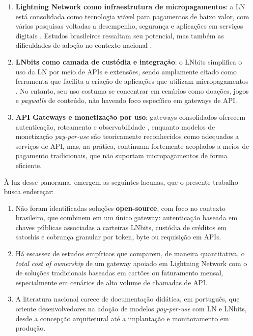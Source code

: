\documentclass[openright]{normas-utf-tex}
\begin{document}
\begin{enumerate}
    \item \textbf{Lightning Network como infraestrutura de micropagamentos}: a LN está consolidada como tecnologia viável para pagamentos de baixo valor, com várias pesquisas voltadas a desempenho, segurança e aplicações em serviços digitais \cite{poon2016lightning, rodriguez2024survey}. Estudos brasileiros ressaltam seu potencial, mas também as dificuldades de adoção no contexto nacional \cite{vargas2019lightning}.
    \item \textbf{LNbits como camada de custódia e integração}: o LNbits simplifica o uso da LN por meio de APIs e extensões, sendo amplamente citado como ferramenta que facilita a criação de aplicações que utilizam micropagamentos \cite{lnbitsdocs}. No entanto, seu uso costuma se concentrar em cenários como doações, jogos e \textit{paywalls} de conteúdo, não havendo foco específico em gateways de API.
    \item \textbf{API Gateways e monetização por uso}: gateways consolidados oferecem autenticação, roteamento e observabilidade \cite{nginx2019microservices}, enquanto modelos de monetização \textit{pay-per-use} são teoricamente reconhecidos como adequados a serviços de API, mas, na prática, continuam fortemente acoplados a meios de pagamento tradicionais, que não suportam micropagamentos de forma eficiente.
\end{enumerate}

À luz desse panorama, emergem as seguintes lacunas, que o presente trabalho busca endereçar:

\begin{enumerate}
    \item Não foram identificadas soluções \textbf{open-source}, com foco no contexto brasileiro, que combinem em um único gateway: autenticação baseada em chaves públicas associadas a carteiras LNbits, custódia de créditos em satoshis e cobrança granular por token, byte ou requisição em APIs.
    \item Há escassez de estudos empíricos que comparem, de maneira quantitativa, o \textit{total cost of ownership} de um gateway apoiado em Lightning Network com o de soluções tradicionais baseadas em cartões ou faturamento mensal, especialmente em cenários de alto volume de chamadas de API.
    \item A literatura nacional carece de documentação didática, em português, que oriente desenvolvedores na adoção de modelos \textit{pay-per-use} com LN e LNbits, desde a concepção arquitetural até a implantação e monitoramento em produção.
\end{enumerate}
\end{document}
